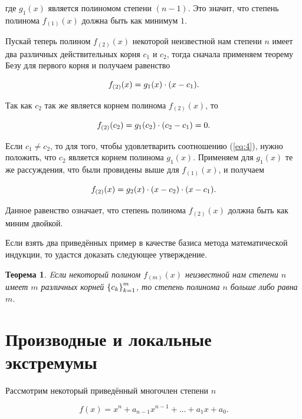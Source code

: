 \documentclass[12pt]{article}
\newtheorem{theorem}{Теорема}[section]
\begin{document}
где $g_1(x)$ является полиномом степени $(n-1)$. Это значит, что степень полинома $f_{(1)}(x)$ должна быть как минимум $1$. 

\par 
Пускай теперь полином $f_{(2)}(x)$ некоторой неизвестной нам степени $n$ имеет два различных действительных корня $c_1$ и $c_2$, тогда сначала применяем теорему Безу для первого корня и получаем равенство

\begin{equation}
  f_{(2)}(x) = g_1(x)\cdot \qty(x-c_1).
\end{equation}

Так как $c_2$ так же является корнем полинома $f_{(2)}(x)$, то 

\begin{equation}
\label{eq:4}
  f_{(2)}(c_2) = g_1(c_2)\cdot \qty(c_2-c_1) = 0.
\end{equation}

Если $c_1 \ne c_2$, то для того, чтобы удовлетварить соотношению (\ref{eq:4}), нужно положить, что $c_2$ является корнем полинома $g_1(x)$. Применяем для $g_1(x)$ те же рассуждения, что были провидены выше для $f_{(1)}(x)$, и получаем

\begin{equation}
  f_{(2)}(x) = g_2(x)\cdot \qty(x-c_2)\cdot \qty(x-c_1).
\end{equation}

Данное равенство означает, что степень полинома $f_{(2)}(x)$ должна быть как миним двойкой.

\par
Если взять два приведённых пример в качестве базиса метода математической индукции, то удастся доказать следующее утверждение.

\begin{theorem}
  Eсли некоторый полином $f_{(m)}(x)$ неизвестной нам степени $n$ имеет $m$ различных корней $\qty{c_k}_{k=1}^m$, то степень полинома $n$ больше либо равна $m$.
\end{theorem}

\section{Производные и локальные экстремумы}
Рассмотрим некоторый приведённый многочлен степени $n$

\begin{equation}
  f(x) = x^n + a_{n-1} x^{n-1} + \ldots + a_1 x + a_0.
\end{equation}
\end{document}
